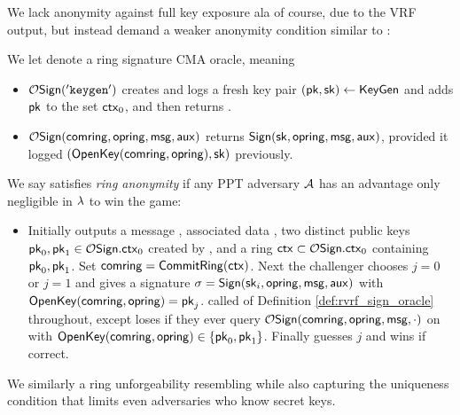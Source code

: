 We lack anonymity against full key exposure ala
 \cite[pp. 6 Def. 4]{cryptoeprint:2005:304} of course, due to the VRF output,
but instead demand a weaker anonymity condition similar to
 \cite[pp. 5 Def. 3]{cryptoeprint:2005:304}:

\begin{definition}\label{def:rvrf_sign_oracle}
We let  denote a ring signature CMA oracle, meaning
\begin{itemize}
\item $\mathcal{O}\mathsf{Sign}(\mathtt{'keygen'})$ creates and logs a fresh key pair
 $(\mathsf{pk},\mathsf{sk}) \leftarrow {\ensuremath{\mathsf{KeyGen}}}$ and adds $\mathsf{pk}$ to the set $\mathsf{ctx}_0$, and then returns \pk.
\item $\mathcal{O}\mathsf{Sign}(\mathsf{comring},\mathsf{opring},\mathsf{msg},\mathsf{aux})$ returns
 ${\mathsf{Sign}}(\mathsf{sk},\mathsf{opring},\mathsf{msg},\mathsf{aux})$, provided it logged $({\mathsf{OpenKey}}(\mathsf{comring},\mathsf{opring}),\mathsf{sk})$ previously.
\end{itemize}
\end{definition}

\begin{definition}
We say \rVRF satisfies {\em ring anonymity} if
any PPT adversary $\mathcal{A}$ has an advantage only
 negligible in $\lambda$ to win the game:
\begin{itemize}
\item[]
 Initially \adv outputs a message \msg, associated data \aux,
 two distinct public keys $\mathsf{pk}_0,\mathsf{pk}_1 \in \mathcal{O}\mathsf{Sign}.\mathsf{ctx}_0$ created by ,
 and a ring $\mathsf{ctx} \subset \mathcal{O}\mathsf{Sign}.\mathsf{ctx}_0$ containing $\mathsf{pk}_0,\mathsf{pk}_1$.
 Set $\mathsf{comring} = {\mathsf{CommitRing}}(\mathsf{ctx})$.
 Next the challenger chooses $j=0$ or $j=1$ and gives
  \adv a signature $\sigma = {\mathsf{Sign}}(\mathsf{sk}_i,\mathsf{opring},\mathsf{msg},\mathsf{aux})$ with ${\mathsf{OpenKey}}(\mathsf{comring},\mathsf{opring}) = \mathsf{pk}_j$.
 \adv called  of Definition \ref{def:rvrf_sign_oracle} throughout,
 except \adv loses if they ever query $\mathcal{O}\mathsf{Sign}(\mathsf{comring},\mathsf{opring},\mathsf{msg},\cdot)$
 on \msg with ${\mathsf{OpenKey}}(\mathsf{comring},\mathsf{opring}) \in \{ \mathsf{pk}_0, \mathsf{pk}_1 \}$.
 Finally \adv guesses $j$ and wins if correct.
\end{itemize}
\end{definition}

We similarly a ring unforgeability resembling
 \cite[pp. 7 Def. 7]{cryptoeprint:2005:304} %
while also capturing the uniqueness condition that limits even adversaries who know secret keys.

